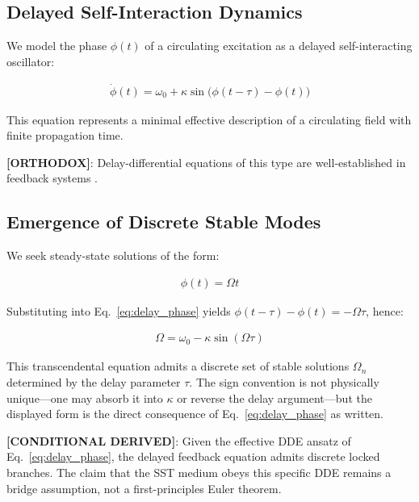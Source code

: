 \documentclass[11pt]{article}
\theoremstyle{definition}
\theoremstyle{plain}
\theoremstyle{remark}
\begin{document}
    \subsection{Delayed Self-Interaction Dynamics}
        
        We model the phase $\phi(t)$ of a circulating excitation as a delayed self-interacting oscillator:
        
        \begin{align}
            \dot{\phi}(t) = \omega_0 + \kappa \sin\big(\phi(t - \tau) - \phi(t)\big)
            \label{eq:delay_phase}
        \end{align}
        
        This equation represents a minimal effective description of a circulating field with finite propagation time.
        
        \textbf{[ORTHODOX]}: Delay-differential equations of this type are well-established in feedback systems \cite{SST_delay_basic}.
    
    \subsection{Emergence of Discrete Stable Modes}
        
        We seek steady-state solutions of the form:
        
        \begin{align}
            \phi(t) = \Omega t
        \end{align}
        
        Substituting into Eq.~\ref{eq:delay_phase} yields $\phi(t-\tau)-\phi(t)=-\Omega\tau$, hence:
        
        \begin{align}
            \Omega = \omega_0 - \kappa \sin(\Omega \tau)
            \label{eq:mode_condition}
        \end{align}
        
        This transcendental equation admits a discrete set of stable solutions $\Omega_n$ determined by the delay parameter $\tau$. The sign convention is not physically unique---one may absorb it into $\kappa$ or reverse the delay argument---but the displayed form is the direct consequence of Eq.~\eqref{eq:delay_phase} as written.
        
        \textbf{[CONDITIONAL DERIVED]}: Given the effective DDE ansatz of Eq.~\eqref{eq:delay_phase}, the delayed feedback equation admits discrete locked branches. The claim that the SST medium obeys this specific DDE remains a bridge assumption, not a first-principles Euler theorem.
    
\end{document}
